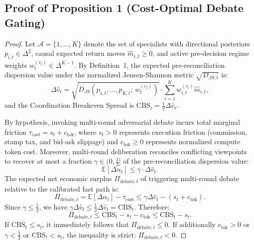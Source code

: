 \documentclass[10pt,a4paper,twocolumn]{article}
\begin{document}
\subsection{Proof of Proposition 1 (Cost-Optimal Debate Gating)}
\begin{proof}
Let $\mathcal{A} = \{1, \dots, K\}$ denote the set of specialists with directional posteriors $p_{i,t} \in \Delta^2$, causal expected return moves $\hat{m}_{i,t} \ge 0$, and active pre-decision regime weights $w_t^{(r_t)} \in \Delta^{K-1}$. By Definition~1, the expected pre-reconciliation dispersion value under the normalized Jensen-Shannon metric $\sqrt{D_{JS,t}}$ is:
\begin{equation}
  \Delta \hat{v}_t = \sqrt{D_{JS}\!\left(p_{1,t}, \dots, p_{K,t}; \, w_t^{(r_t)}\right)} \cdot \sum_{i=1}^K w_{i,t}^{(r_t)} \hat{m}_{i,t},
\end{equation}
and the Coordination Breakeven Spread is $\text{CBS}_t = \frac{1}{2}\Delta \hat{v}_t$.

By hypothesis, invoking multi-round adversarial debate incurs total marginal friction $\tau_{\text{cost}} = s_t + c_{\text{tok}}$, where $s_t > 0$ represents execution friction (commission, stamp tax, and bid-ask slippage) and $c_{\text{tok}} \ge 0$ represents normalized compute token cost. Moreover, multi-round deliberation reconciles conflicting viewpoints to recover at most a fraction $\gamma \in (0, \frac{1}{2}]$ of the pre-reconciliation dispersion value:
\begin{equation}
  \mathbb{E}\left[\Delta \alpha_t\right] \le \gamma \cdot \Delta \hat{v}_t.
\end{equation}
The expected net economic surplus $\Pi_{\text{debate}, t}$ of triggering multi-round debate relative to the calibrated fast path is:
\begin{equation}
  \Pi_{\text{debate}, t} = \mathbb{E}\left[\Delta \alpha_t\right] - \tau_{\text{cost}} \le \gamma \Delta \hat{v}_t - (s_t + c_{\text{tok}}).
\end{equation}
Since $\gamma \le \frac{1}{2}$, we have $\gamma \Delta \hat{v}_t \le \frac{1}{2}\Delta \hat{v}_t = \text{CBS}_t$. Therefore:
\begin{equation}
  \Pi_{\text{debate}, t} \le \text{CBS}_t - s_t - c_{\text{tok}} \le \text{CBS}_t - s_t.
\end{equation}
If $\text{CBS}_t \le s_t$, it immediately follows that $\Pi_{\text{debate}, t} \le 0$. If additionally $c_{\text{tok}} > 0$ or $\gamma < \frac{1}{2}$ or $\text{CBS}_t < s_t$, the inequality is strict: $\Pi_{\text{debate}, t} < 0$.


\end{proof}
\end{document}
